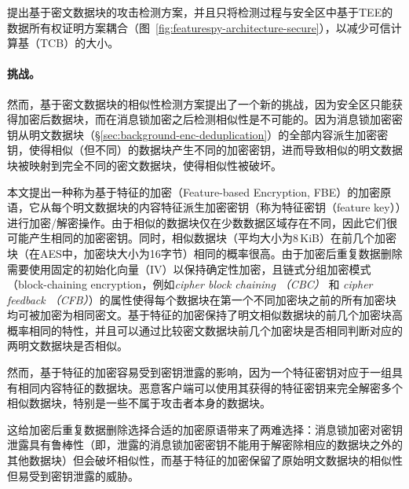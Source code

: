 \sysnameF 提出基于密文数据块的攻击检测方案，并且只将检测过程与安全区中基于TEE的数据所有权证明方案耦合（图~\ref{fig:featurespy-architecture-secure}），以减少可信计算基（TCB）的大小。

\paragraph*{挑战。}
然而，基于密文数据块的相似性检测方案提出了一个新的挑战，因为安全区只能获得加密后数据块，而在消息锁加密之后检测相似性是不可能的。因为消息锁加密密钥从明文数据块（\S\ref{sec:background-enc-deduplication}）的全部内容派生加密密钥，使得相似（但不同）的数据块产生不同的加密密钥，进而导致相似的明文数据块被映射到完全不同的密文数据块，使得相似性被破坏。

本文提出一种称为基于特征的加密（Feature-based Encryption, FBE）的加密原语，它从每个明文数据块的内容特征派生加密密钥（称为特征密钥（feature key））进行加密/解密操作。由于相似的数据块仅在少数数据区域存在不同，因此它们很可能产生相同的加密密钥。同时，相似数据块（平均大小为8\,KiB）在前几个加密块（在AES中，加密块大小为16字节）相同的概率很高。由于加密后重复数据删除\cite{douceur2002reclaiming, shah15}需要使用固定的初始化向量（IV）以保持确定性加密，且链式分组加密模式（block-chaining encryption，例如{\em cipher block chaining （CBC）} 和 {\em cipher feedback （CFB）}\cite{dworkin01}）的属性使得每个数据块在第一个不同加密块之前的所有加密块均可被加密为相同密文。基于特征的加密保持了明文相似数据块的前几个加密块高概率相同的特性，并且可以通过比较密文数据块前几个加密块是否相同判断对应的两明文数据块是否相似。

然而，基于特征的加密容易受到密钥泄露的影响，因为一个特征密钥对应于一组具有相同内容特征的数据块。恶意客户端可以使用其获得的特征密钥来完全解密多个相似数据块，特别是一些不属于攻击者本身的数据块。

这给加密后重复数据删除选择合适的加密原语带来了两难选择：消息锁加密对密钥泄露具有鲁棒性（即，泄露的消息锁加密密钥不能用于解密除相应的数据块之外的其他数据块）但会破坏相似性，而基于特征的加密保留了原始明文数据块的相似性但易受到密钥泄露的威胁。
